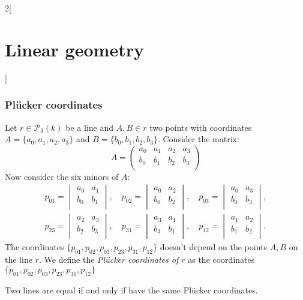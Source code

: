\documentclass[class=article,10pt,crop=false]{standalone}
\begin{document}
\begin{multicols}{2}[\section{Linear geometry}]
\subsubsection{Plücker coordinates}
\begin{prop}
Let $r\in\mathcal{P}_3(k)$ be a line and $A,B\in r$ two points with coordinates $A=\{a_0,a_1,a_2,a_3\}$ and $B=\{b_0,b_1,b_2,b_3\}$. Consider the matrix: $$A=\begin{pmatrix}
a_0 & a_1 & a_2 & a_3 \\
b_0 & b_1 & b_2 & b_3 \\
\end{pmatrix}$$ Now consider the six minors of $A$:
\begin{gather*}
    p_{01}=\begin{vmatrix}
a_0 & a_1 \\
b_0 & b_1 \\
\end{vmatrix},\quad p_{02}=\begin{vmatrix}
a_0 & a_2 \\
b_0 & b_2 \\
\end{vmatrix},\quad p_{03}=\begin{vmatrix}
a_0 & a_3 \\
b_0 & b_3 \\
\end{vmatrix},\\ p_{23}=\begin{vmatrix}
a_2 & a_3 \\
b_2 & b_3 \\
\end{vmatrix},\quad p_{31}=\begin{vmatrix}
a_3 & a_1 \\
b_3 & b_1 \\
\end{vmatrix},\quad p_{12}=\begin{vmatrix}
a_1 & a_2 \\
b_1 & b_2 \\
\end{vmatrix}.
\end{gather*}
The coordinates $\{p_{01},p_{02},p_{03},p_{23},p_{31},p_{12}\}$ doesn't depend on the points $A,B$ on the line $r$. We define the \textit{Plücker coordinates of $r$} as the coordinates $\{p_{01},p_{02},p_{03},p_{23},p_{31},p_{12}\}$ 
\end{prop}
\begin{prop}
Two lines are equal if and only if have the same Plücker coordinates.

\end{prop}
\end{multicols}
\end{document}
